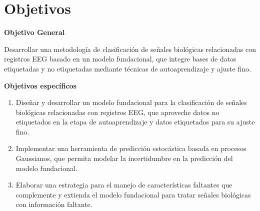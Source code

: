 \section{Objetivos}

\textbf{Objetivo General}

Desarrollar una metodología de clasificación de señales biológicas relacionadas con registros EEG basado en un modelo fundacional, que integre bases de datos etiquetadas y no etiquetadas mediante técnicas de autoaprendizaje y ajuste fino.

\textbf{Objetivos específicos }

\begin{enumerate}
	\item Diseñar y desarrollar un modelo fundacional para la clasificación de señales biológicas relacionadas con registros EEG, que aproveche datos no etiquetados en la etapa de autoaprendizaje y datos etiquetados para su ajuste fino.
	
	\item Implementar una herramienta de predicción estocástica basada en procesos Gaussianos, que permita modelar la incertidumbre en la predicción del modelo fundacional.
	
	\item Elaborar una estrategia para el manejo de características faltantes que complemente y extienda el modelo fundacional para tratar señales biológicas con información faltante. 
\end{enumerate}